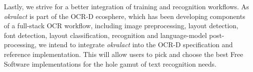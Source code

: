 \documentclass[conference]{IEEEtran}
\begin{document}



Lastly, we strive for a better integration of training and
recognition workflows. As \textit{okralact} is part of the OCR-D
ecosphere, which has been developing components of a full-stack
OCR workflow, including image preprocessing, layout detection, font
detection, layout classification, recognition and language-model
post-processing, we intend to integrate \textit{okralact} into the
OCR-D specification and reference implementation. This will allow
users to pick and choose the best Free Software implementations for
the hole gamut of text recognition needs.




%
%
%



\end{document}
